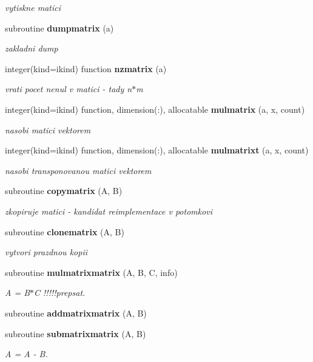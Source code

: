 \begin{DoxyCompactItemize}
\begin{DoxyCompactList}\small\item\em vytiskne matici \end{DoxyCompactList}\item 
subroutine {\bf dumpmatrix} (a)
\begin{DoxyCompactList}\small\item\em zakladni dump \end{DoxyCompactList}\item 
integer(kind=ikind) function {\bf nzmatrix} (a)
\begin{DoxyCompactList}\small\item\em vrati pocet nenul v matici -\/ tady n$\ast$m \end{DoxyCompactList}\item 
integer(kind=ikind) function, dimension(\+:), allocatable {\bf mulmatrix} (a, x, count)
\begin{DoxyCompactList}\small\item\em nasobi matici vektorem \end{DoxyCompactList}\item 
integer(kind=ikind) function, dimension(\+:), allocatable {\bf mulmatrixt} (a, x, count)
\begin{DoxyCompactList}\small\item\em nasobi transponovanou matici vektorem \end{DoxyCompactList}\item 
subroutine {\bf copymatrix} (A, B)
\begin{DoxyCompactList}\small\item\em zkopiruje matici -\/ kandidat reimplementace v potomkovi \end{DoxyCompactList}\item 
subroutine {\bf clonematrix} (A, B)
\begin{DoxyCompactList}\small\item\em vytvori prazdnou kopii \end{DoxyCompactList}\item 
subroutine {\bf mulmatrixmatrix} (A, B, C, info)
\begin{DoxyCompactList}\small\item\em A = B$\ast$C !!!!!prepsat. \end{DoxyCompactList}\item 
subroutine {\bf addmatrixmatrix} (A, B)
\item 
subroutine {\bf submatrixmatrix} (A, B)
\begin{DoxyCompactList}\small\item\em A = A -\/ B. \end{DoxyCompactList}\item 

\end{DoxyCompactItemize}
